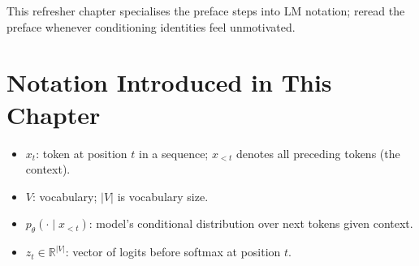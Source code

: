 This refresher chapter specialises the preface steps into LM notation; reread the preface whenever conditioning identities feel unmotivated.

\section*{Notation Introduced in This Chapter}
\begin{itemize}[leftmargin=1.5em]
  \item $x_t$: token at position $t$ in a sequence; $x_{<t}$ denotes all preceding tokens (the context).
  \item $V$: vocabulary; $|V|$ is vocabulary size.
  \item $p_\theta(\cdot \mid x_{<t})$: model's conditional distribution over next tokens given context.
  \item $z_t\in\mathbb{R}^{|V|}$: vector of logits before softmax at position $t$.
\end{itemize}

